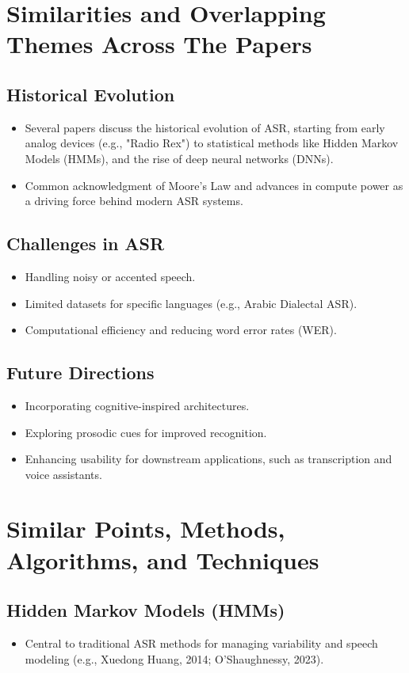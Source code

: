\section{Similarities and Overlapping Themes Across The Papers}
\subsection{Historical Evolution}
\begin{itemize}
    \item Several papers discuss the historical evolution of ASR, starting from early analog devices (e.g., "Radio Rex") to statistical methods like Hidden Markov Models (HMMs), and the rise of deep neural networks (DNNs).
    \item Common acknowledgment of Moore’s Law and advances in compute power as a driving force behind modern ASR systems.
\end{itemize}

\subsection{Challenges in ASR}
\begin{itemize}
    \item Handling noisy or accented speech.
    \item Limited datasets for specific languages (e.g., Arabic Dialectal ASR).
    \item Computational efficiency and reducing word error rates (WER).
\end{itemize}

\subsection{Future Directions}
\begin{itemize}
    \item Incorporating cognitive-inspired architectures.
    \item Exploring prosodic cues for improved recognition.
    \item Enhancing usability for downstream applications, such as transcription and voice assistants.
\end{itemize}

\section{Similar Points, Methods, Algorithms, and Techniques}
\subsection{Hidden Markov Models (HMMs)}
\begin{itemize}
    \item Central to traditional ASR methods for managing variability and speech modeling (e.g., Xuedong Huang, 2014; O'Shaughnessy, 2023).
\end{itemize}

